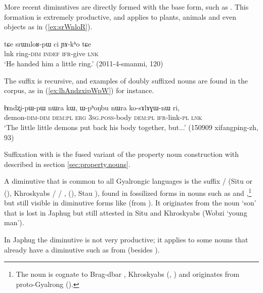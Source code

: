 More recent diminutives are directly formed with the base form, such as . This formation is extremely productive, and applies to plants, animals and even objects as in (\ref{ex:srWnloR}).

\begin{exe}
\ex \label{ex:srWnloR}
\gll tɕe srɯnloʁ-pɯ ci ɲɤ-kʰo tɕe \\
lnk ring-\textsc{dim} \textsc{indef} \textsc{ifr}-give \textsc{lnk} \\
\glt `He handed him a little ring.' (2011-4-smanmi, 120)
\end{exe}

The suffix  is recursive, and examples of doubly suffixed nouns are found in the corpus, as in (\ref{ex:lhAndzxipWpW}) for instance. 

\begin{exe}
\ex \label{ex:lhAndzxipWpW}
\gll  ɬɤndʐi-pɯ-pɯ nɯra kɯ, ɯ-pʰoŋbu nɯra ko-sɤlɤɣɯ-nɯ ri, \\
demon-\textsc{dim}-\textsc{dim} \textsc{dem}:\textsc{pl} \textsc{erg} \textsc{3sg}.\textsc{poss}-body \textsc{dem}:\textsc{pl} \textsc{ifr}-link-\textsc{pl} \textsc{lnk} \\
\glt `The little little demons put back his body together, but...' (150909 xifangping-zh, 93)
\end{exe}

Suffixation with  is the fused variant of the property noun construction with  described in section \ref{sec:property.nouns}.

A diminutive that is common to all Gyalrongic languages is the suffix / (Situ  or  (\citealt[163]{linxr93jiarongen}), Khroskyabs  /  / ,  (\citealt[158]{lai17khroskyabs}), Stau ), found in fossilized forms in nouns such as  and ,\footnote{The noun  is cognate to Brag-dbar , Khroskyabs  (\citealt{zhang16bragdbar}, \citealt[156]{lai17khroskyabs}) and originates from proto-Gyalrong  (\citealt[53]{jacques08zh}). } but still visible in diminutive forms like  (from ). It originates from the noun `son' that is lost in Japhug but still attested in Situ and Khroskyabs (Wobzi  `young man'). 

In Japhug the  diminutive is not very productive; it applies to some nouns that already have a  diminutive such as  from  (besides ).

